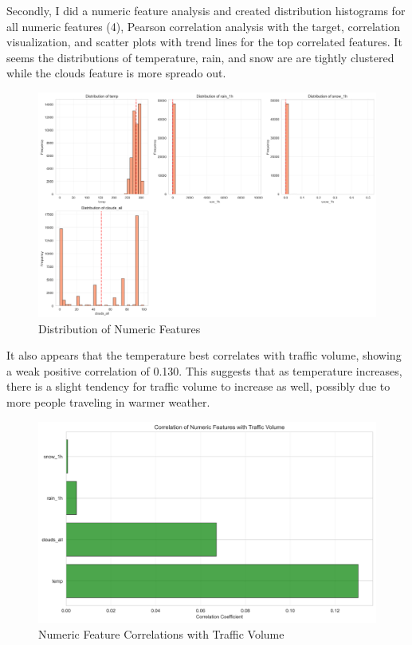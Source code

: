 \documentclass[12pt]{article}
\begin{document}
Secondly, I did a numeric feature analysis and created distribution histograms for all numeric features (4), Pearson correlation analysis with the target,
correlation visualization, and scatter plots with trend lines for the top correlated features.
It seems the distributions of temperature, rain, and snow are are tightly clustered while the clouds feature is more spreado out.
\begin{figure}[H]
    \centering
    \includegraphics[width=1\textwidth]{images/eda_numeric_distributions.png}
    \caption{Distribution of Numeric Features}
    \label{fig:eda_numeric_distributions}
\end{figure}

It also appears that the temperature best correlates with traffic volume, showing a weak positive correlation of 0.130. This suggests that as temperature increases, 
there is a slight tendency for traffic volume to increase as well, possibly due to more people traveling in warmer weather.
\begin{figure}[H]
    \centering
    \includegraphics[width=1\textwidth]{images/eda_numeric_correlations.png}
    \caption{Numeric Feature Correlations with Traffic Volume}
    \label{fig:eda_numeric_correlations}
\end{figure}
\end{document}
